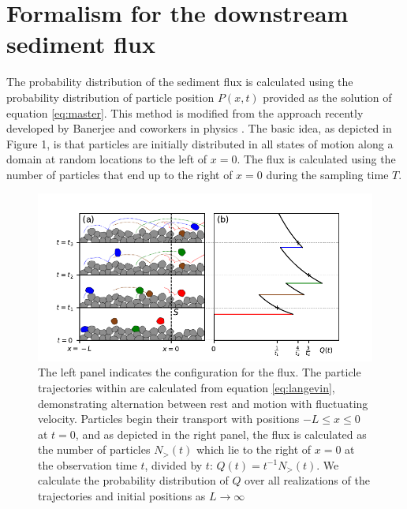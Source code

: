 \section{Formalism for the downstream sediment flux}
The probability distribution of the sediment flux is calculated using the probability distribution of particle position $P(x,t)$ provided as the solution of equation \ref{eq:master}. This method is modified from the approach recently developed by Banerjee and coworkers in physics \citep{Banerjee2020}. The basic idea, as depicted in Figure 1, is that particles are initially distributed in all states of motion along a domain at random locations to the left of $x=0$. The flux is calculated using the number of particles that end up to the right of $x=0$ during the sampling time $T$.
\begin{figure}
	\centerline{\includegraphics{./figures/ch2/figure1.pdf}}
	\caption{The left panel indicates the configuration for the flux. The particle trajectories within are calculated from equation \ref{eq:langevin}, demonstrating alternation between rest and motion with fluctuating velocity. Particles begin their transport with positions $-L\leq x \leq 0$ at $t=0$, and as depicted in the right panel, the flux is calculated as the number of particles $N_>(t)$ which lie to the right of $x=0$ at the observation time $t$, divided by $t$: $Q(t) = t^{-1}N_>(t)$. We calculate the probability distribution of $Q$ over all realizations of the trajectories and initial positions as $L\rightarrow \infty$}
	\label{fig:fig1}
\end{figure}

